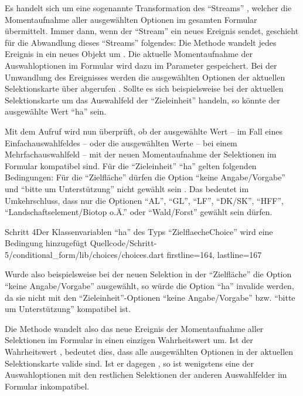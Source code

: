 Es handelt sich um eine sogenannte Transformation des \enquote{Streams} , welcher die Momentaufnahme aller ausgewählten Optionen im gesamten Formular übermittelt.
Immer dann, wenn der \enquote{Stream}  ein neues Ereignis sendet,
geschieht für die Abwandlung dieses \enquote{Streams} folgendes:
Die Methode  wandelt jedes Ereignis in ein neues Objekt um .
Die aktuelle Momentaufnahme der Auswahloptionen im Formular wird dazu im Parameter  gespeichert.
Bei der Umwandlung des Ereignisses werden die ausgewählten Optionen der aktuellen Selektionskarte über  abgerufen .
Sollte es sich beispielsweise bei der aktuellen Selektionskarte um das Auswahlfeld der \enquote{Zieleinheit} handeln,
so könnte der ausgewählte Wert \enquote{ha} sein.

Mit dem Aufruf  wird nun überprüft, ob der ausgewählte Wert
-- im Fall eines Einfachauswahlfeldes --
oder die ausgewählten Werte
-- bei einem Mehrfachauswahlfeld --
mit der neuen Momentaufnahme der Selektionen im Formular kompatibel sind.
Für die \enquote{Zieleinheit} \enquote{ha} gelten folgenden Bedingungen:
Für die \enquote{Zielfläche} dürfen die Option \enquote{keine Angabe/Vorgabe} und
\enquote{bitte um Unterstützung} nicht gewählt sein .
Das bedeutet im Umkehrschluss,
dass nur die Optionen \enquote{AL},
\enquote{GL},
\enquote{LF},
\enquote{DK/SK},
\enquote{HFF},
\enquote{Landschaftselement/Biotop o.Ä.} 
oder \enquote{Wald/Forst} gewählt sein dürfen. 

\begin{alexlisting}{Schritt 4}{Der Klassenvariablen \enquote{ha} des Typs \enquote{ZielflaecheChoice} wird eine Bedingung hinzugefügt}
  {Quellcode/Schritt-5/conditional_form/lib/choices/choices.dart}
  {firstline=164, lastline=167}
  \label{lst:Schritt5ha}
\end{alexlisting}

Wurde also beispielsweise bei der neuen Selektion in der \enquote{Zielfläche} die Option \enquote{keine Angabe/Vorgabe} ausgewählt,
so würde die Option \enquote{ha} invalide werden,
da sie nicht mit den \enquote{Zieleinheit}-Optionen \enquote{keine Angabe/Vorgabe} bzw. \enquote{bitte um Unterstützung}  kompatibel ist.

Die Methode   wandelt also das neue Ereignis der Momentaufnahme aller Selektionen im Formular in einen einzigen Wahrheitswert um.
Ist der Wahrheitswert ,
bedeutet dies,
dass alle ausgewählten Optionen in der aktuellen Selektionskarte valide sind.
Ist er dagegen , so ist wenigstens eine der Auswahloptionen mit den restlichen Selektionen der anderen Auswahlfelder im Formular inkompatibel.



